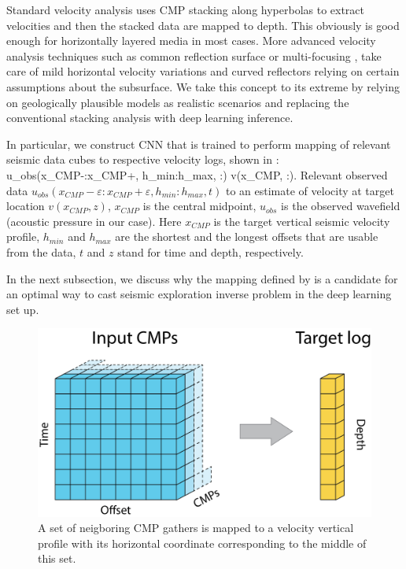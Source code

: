 \documentclass[manuscript]{geophysics}
\begin{document}
Standard velocity analysis uses CMP stacking along hyperbolas to extract velocities and then the stacked data are mapped to depth. This obviously is good enough for horizontally layered media in most cases. More advanced velocity analysis techniques such as common reflection surface  \citep{mann1999common} or multi-focusing \citep{gelchinsky1999multifocusing}, take care of mild horizontal velocity variations and curved reflectors relying on certain assumptions about the subsurface. We take this concept to its extreme by relying on geologically plausible models as realistic scenarios and replacing the conventional stacking analysis with deep learning inference.

In particular, we construct CNN that is trained to perform mapping of relevant seismic data cubes to respective velocity logs, shown in : 
\beq \label{eq:mapping}
u_{obs}(x_{CMP}-\varepsilon:x_{CMP}+\varepsilon, h_{min}:h_{max}, :) \to v(x_{CMP}, :).
\eeq
Relevant observed data $u_{obs}(x_{CMP}-\varepsilon:x_{CMP}+\varepsilon, h_{min}:h_{max}, t)$  
to an estimate of velocity at target location $v(x_{CMP}, z)$, $x_{CMP}$ is the central midpoint,
$u_{obs}$ is the observed wavefield (acoustic pressure in our case). Here $x_{CMP}$ is the target vertical seismic velocity profile, $h_{min}$ and $h_{max}$ are the shortest and the longest offsets that are usable from the data, $t$ and $z$ stand for time and depth, respectively.

In the next subsection, we discuss why the mapping defined by  is a candidate for an optimal way to cast seismic exploration inverse problem in the deep learning set up.  
\begin{figure}[h!]
	\centering
	\includegraphics[width=0.7\linewidth]{Fig/in_out_shape}
	\caption{A set of neigboring CMP gathers is mapped to a velocity vertical profile with its horizontal coordinate corresponding to the middle of this set.}
	\label{fig:in_out}
\end{figure}
\end{document}

